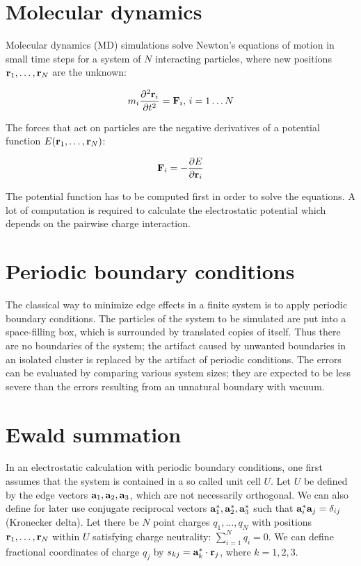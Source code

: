 \documentclass[12pt,a4paper,notitlepage]{report}
\begin{document}
\section{Molecular dynamics}

Molecular dynamics (MD) simulations solve Newton’s equations of motion in small time steps for a system of
$N$ interacting particles, where new positions $\bold{r}_1, \ldots, \bold{r}_N$ are the unknown:

\[m_i \frac{\partial^2\bold{r}_i}{\partial t^2} = \bold{F}_i, \, i = 1\ldots N\]

The forces that act on particles are the negative derivatives of a potential function $E(\bold{r}_1,\ldots,\bold{r}_N)$:

\[\bold{F}_i = - \frac{\partial E}{\partial \bold{r}_i}\]

The potential function has to be computed first in order to solve the equations.
A lot of computation is required to calculate the electrostatic potential which depends on the pairwise charge interaction.

\section{Periodic boundary conditions}

The classical way to minimize edge effects in a finite system is to apply
periodic boundary conditions. The particles of the system to be simulated are put into a space-filling box, which is surrounded by translated copies of itself. Thus there are no boundaries of the system; the artifact caused by unwanted boundaries in an isolated cluster is replaced by the artifact of periodic conditions. The errors can be evaluated by comparing various system sizes; they are expected to be less severe than the errors resulting from an unnatural boundary with vacuum.

\section{Ewald summation}

In an electrostatic calculation with periodic boundary conditions, one first assumes that the system is contained in a so called unit cell $U$. Let $U$ be defined by the edge vectors $\bold{a}_1, \bold{a}_2, \bold{a}_3$, which are not necessarily orthogonal. We can also define for later use conjugate reciprocal vectors $\bold{a}_1^*, \bold{a}_2^*, \bold{a}_3^*$ such that $\bold{a}_i^* \bold{a}_j = \delta_{ij}$ (Kronecker delta).
 Let there be $N$ point charges $q_1, \dotsc, q_N$ with positions $\bold{r}_1, \dotsc, \bold{r}_N$ within $U$ satisfying charge neutrality:  $\sum\limits_{i=1}^N q_i=0$. We can define fractional coordinates of charge $q_j$ by $s_{kj} = \bold{a}_k^* \cdot \bold{r}_j$, where $k = 1, 2, 3$.
 
\end{document}
